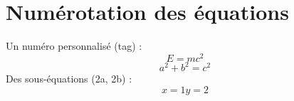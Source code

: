 \documentclass{article}
\begin{document}
\hsize=380pt
\section{Num\'erotation des \'equations}
Un num\'ero personnalis\'e (tag) :
\begin{equation} E = m c^2 \tag{*} \end{equation}
\begin{equation} a^2 + b^2 = c^2 \end{equation}
Des sous-\'equations (2a, 2b) :
\begin{subequations}
\begin{equation} x = 1 \end{equation}
\begin{equation} y = 2 \end{equation}
\end{subequations}
\end{document}
